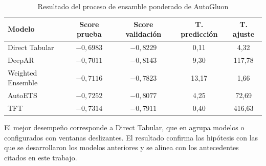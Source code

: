 \begin{table}[htbp]
\centering
\caption{Resultado del proceso de ensamble ponderado de AutoGluon}
\label{tab:resultado-del-proceso-de-ensamble-ponder}
\begin{tabular}{@{}lcccc@{}}
\toprule
\textbf{Modelo} & \textbf{Score prueba} & \textbf{Score validación} & \textbf{T. predicción} & \textbf{T. ajuste} \\
\midrule
Direct Tabular & $-0{,}6983$ & $-0{,}8229$ & 0,11 & 4,32 \\
DeepAR & $-0{,}7011$ & $-0{,}8143$ & 9,30 & 117,78 \\
Weighted Ensemble & $-0{,}7116$ & $-0{,}7823$ & 13,17 & 1,66 \\
AutoETS & $-0{,}7252$ & $-0{,}8077$ & 4,25 & 72,69 \\
TFT & $-0{,}7314$ & $-0{,}7911$ & 0,40 & 416,63 \\
\bottomrule
\end{tabular}
\end{table}

El mejor desempeño corresponde a Direct Tabular, que en \autogluon{} agrupa modelos \xgboost{} o \lightgbm{} configurados con ventanas deslizantes. El resultado confirma las hipótesis con las que se desarrollaron los modelos anteriores y se alinea con los antecedentes citados en este trabajo.
